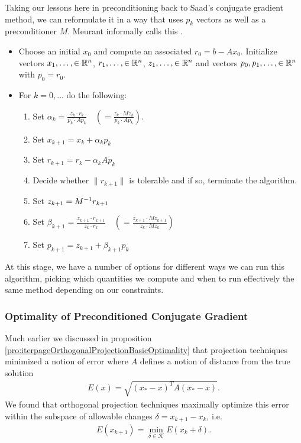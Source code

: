 \documentclass[11pt]{article}
\begin{document}
Taking our lessons here in preconditioning back to Saad's conjugate gradient method, we can reformulate it in a way that uses $p_k$ vectors as well as a preconditioner $M$. Meurant informally calls this . \begin{itemize}
\item Choose an initial $x_0$ and compute an associated $r_0 = b - Ax_0$. Initialize vectors $x_1,\dots, \in \mathbb{R}^n$, $r_1,\dots, \in \mathbb{R}^n$, $z_1,\dots, \in \mathbb{R}^n$ and vectors $p_0,p_1,\dots, \in \mathbb{R}^n$ with $p_0 = r_0$.
\item For $k = 0, \dots$ do the following: \begin{enumerate}
	\item Set $\alpha_k = \frac{z_k \cdot r_k}{p_k \cdot A p_k} \hspace{1em} \left( = \frac{z_k \cdot Mz_k}{p_k \cdot A p_k} \right)$.
	\item Set $x_{k+1} = x_k + \alpha_k p_k$
	\item Set $r_{k+1} = r_k - \alpha_k A p_k$
	\item Decide whether $\lVert r_{k+1} \rVert$ is tolerable and if so, terminate the algorithm.
	\item Set $z_{k+1} = M^{-1} r_{k+1}$
	\item Set $\beta_{k+1} = \frac{z_{k+1} \cdot r_{k+1} }{z_k \cdot r_k } \hspace{1em} \left( = \frac{z_{k+1} \cdot Mz_{k+1} }{z_k \cdot Mz_k } \right)$
	\item Set $p_{k+1} = z_{k+1} + \beta_{k+1} p_k$
\end{enumerate}
\end{itemize}

At this stage, we have a number of options for different ways we can run this algorithm, picking which quantities we compute and when to run effectively the same method depending on our constraints.

\subsubsection{Optimality of Preconditioned Conjugate Gradient}

Much earlier we discussed in proposition \ref{pro:iterpageOrthogonalProjectionBasicOptimality} that projection techniques minimized a notion of error where $A$ defines a notion of distance from the true solution \begin{gather*}
E(x) = \sqrt{(x_* - x)^T A (x_* - x)}.
\end{gather*}
We found that orthogonal projection techniques maximally optimize this error within the subspace of allowable changes $\delta = x_{k+1} - x_k$, i.e. \begin{gather*}
E(x_{k+1}) = \min_{\delta \in \mathcal K} E(x_k + \delta). 
\end{gather*}
\end{document}
